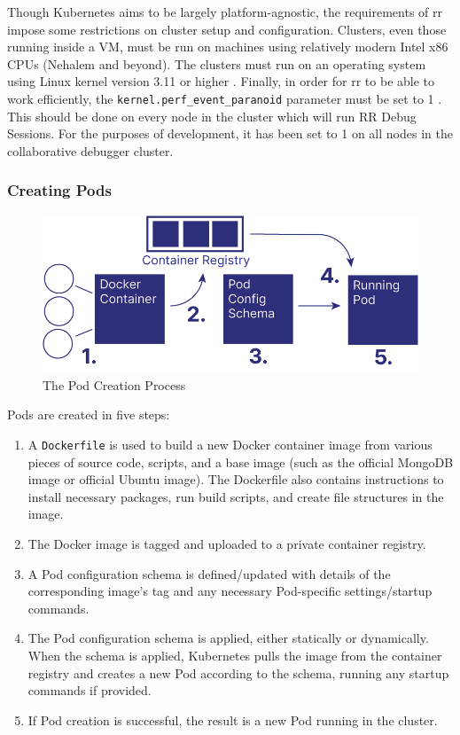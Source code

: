 \documentclass[12pt]{article}
\begin{document}
Though Kubernetes aims to be largely platform-agnostic, the
requirements of rr impose some restrictions on cluster setup and
configuration.  Clusters, even those running inside a VM, must be run
on machines using relatively modern Intel x86 CPUs (Nehalem and
beyond).  The clusters must run on an operating system using Linux
kernel version 3.11 or higher \cite{rr-repo}.  Finally, in order for
rr to be able to work efficiently, the
\lstinline{kernel.perf_event_paranoid} parameter must be set to 1
\cite{rr-repo}.  This should be done on every node in the cluster
which will run RR Debug Sessions.  For the purposes of development, it
has been set to 1 on all nodes in the collaborative debugger cluster.

\subsubsection{Creating Pods}

\begin{figure}[h!]

  \includegraphics[scale=.9]{pod_creation}
  \centering
  \caption{The Pod Creation Process}
  \label{podcreation:overview}
\end{figure}

Pods are created in five steps:

\begin{enumerate}
\item A \lstinline{Dockerfile} is used to build a new Docker container
  image from various pieces of source code, scripts, and a base image
  (such as the official MongoDB image or official Ubuntu image).  The
  Dockerfile also contains instructions to install necessary packages,
  run build scripts, and create file structures in the image.
\item The Docker image is tagged and uploaded to a private container
  registry.
\item A Pod configuration schema is defined/updated with details of
  the corresponding image's tag and any necessary Pod-specific
  settings/startup commands.
\item The Pod configuration schema is applied, either statically or
  dynamically.  When the schema is applied, Kubernetes pulls the image
  from the container registry and creates a new Pod according to the
  schema, running any startup commands if provided.
\item If Pod creation is successful, the result is a new Pod running
  in the cluster.
\end{enumerate}
\end{document}
